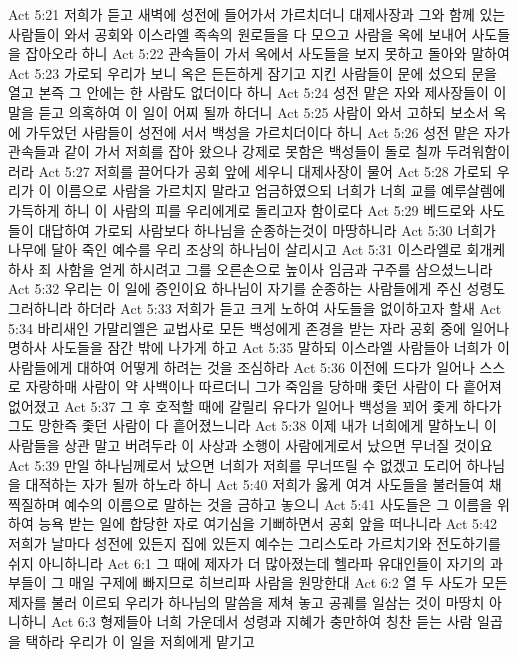 Act 5:21  저희가 듣고 새벽에 성전에 들어가서 가르치더니 대제사장과 그와 함께 있는 사람들이 와서 공회와 이스라엘 족속의 원로들을 다 모으고 사람을 옥에 보내어 사도들을 잡아오라 하니
Act 5:22  관속들이 가서 옥에서 사도들을 보지 못하고 돌아와 말하여
Act 5:23  가로되 우리가 보니 옥은 든든하게 잠기고 지킨 사람들이 문에 섰으되 문을 열고 본즉 그 안에는 한 사람도 없더이다 하니
Act 5:24  성전 맡은 자와 제사장들이 이 말을 듣고 의혹하여 이 일이 어찌 될까 하더니
Act 5:25  사람이 와서 고하되 보소서 옥에 가두었던 사람들이 성전에 서서 백성을 가르치더이다 하니
Act 5:26  성전 맡은 자가 관속들과 같이 가서 저희를 잡아 왔으나 강제로 못함은 백성들이 돌로 칠까 두려워함이러라
Act 5:27  저희를 끌어다가 공회 앞에 세우니 대제사장이 물어
Act 5:28  가로되 우리가 이 이름으로 사람을 가르치지 말라고 엄금하였으되 너희가 너희 교를 예루살렘에 가득하게 하니 이 사람의 피를 우리에게로 돌리고자 함이로다
Act 5:29  베드로와 사도들이 대답하여 가로되 사람보다 하나님을 순종하는것이 마땅하니라
Act 5:30  너희가 나무에 달아 죽인 예수를 우리 조상의 하나님이 살리시고
Act 5:31  이스라엘로 회개케 하사 죄 사함을 얻게 하시려고 그를 오른손으로 높이사 임금과 구주를 삼으셨느니라
Act 5:32  우리는 이 일에 증인이요 하나님이 자기를 순종하는 사람들에게 주신 성령도 그러하니라 하더라
Act 5:33  저희가 듣고 크게 노하여 사도들을 없이하고자 할새
Act 5:34  바리새인 가말리엘은 교법사로 모든 백성에게 존경을 받는 자라 공회 중에 일어나 명하사 사도들을 잠간 밖에 나가게 하고
Act 5:35  말하되 이스라엘 사람들아 너희가 이 사람들에게 대하여 어떻게 하려는 것을 조심하라
Act 5:36  이전에 드다가 일어나 스스로 자랑하매 사람이 약 사백이나 따르더니 그가 죽임을 당하매 좇던 사람이 다 흩어져 없어졌고
Act 5:37  그 후 호적할 때에 갈릴리 유다가 일어나 백성을 꾀어 좇게 하다가 그도 망한즉 좇던 사람이 다 흩어졌느니라
Act 5:38  이제 내가 너희에게 말하노니 이 사람들을 상관 말고 버려두라 이 사상과 소행이 사람에게로서 났으면 무너질 것이요
Act 5:39  만일 하나님께로서 났으면 너희가 저희를 무너뜨릴 수 없겠고 도리어 하나님을 대적하는 자가 될까 하노라 하니
Act 5:40  저희가 옳게 여겨 사도들을 불러들여 채찍질하며 예수의 이름으로 말하는 것을 금하고 놓으니
Act 5:41  사도들은 그 이름을 위하여 능욕 받는 일에 합당한 자로 여기심을 기뻐하면서 공회 앞을 떠나니라
Act 5:42  저희가 날마다 성전에 있든지 집에 있든지 예수는 그리스도라 가르치기와 전도하기를 쉬지 아니하니라
Act 6:1  그 때에 제자가 더 많아졌는데 헬라파 유대인들이 자기의 과부들이 그 매일 구제에 빠지므로 히브리파 사람을 원망한대
Act 6:2  열 두 사도가 모든 제자를 불러 이르되 우리가 하나님의 말씀을 제쳐 놓고 공궤를 일삼는 것이 마땅치 아니하니
Act 6:3  형제들아 너희 가운데서 성령과 지혜가 충만하여 칭찬 듣는 사람 일곱을 택하라 우리가 이 일을 저희에게 맡기고
